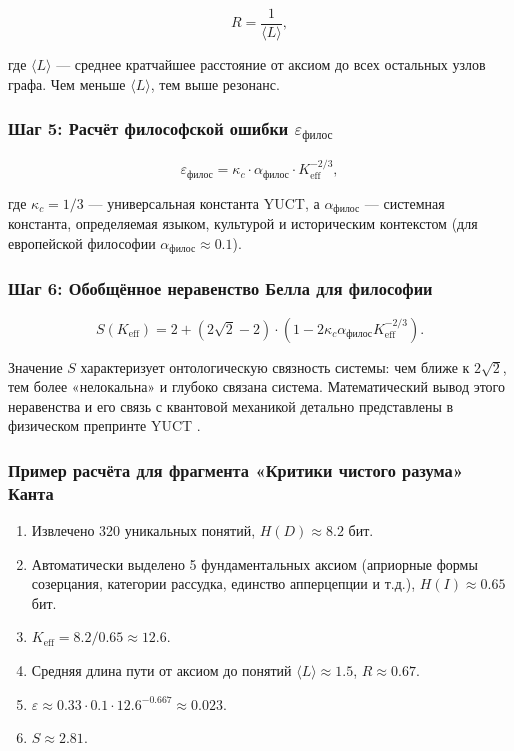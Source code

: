 \documentclass[12pt,a4paper]{article}
\newcommand{\kappac}{\kappa_c}
\newcommand{\eps}{\varepsilon}
\begin{document}
	\[
	R = \frac{1}{\langle L \rangle},
	\]
	
	где \(\langle L \rangle\) — среднее кратчайшее расстояние от аксиом до всех остальных узлов графа. Чем меньше \(\langle L \rangle\), тем выше резонанс.
	
	\subsubsection{Шаг 5: Расчёт философской ошибки \(\eps_{\text{филос}}\)}
	
	\[
	\eps_{\text{филос}} = \kappac \cdot \alpha_{\text{филос}} \cdot K_{\mathrm{eff}}^{-2/3},
	\]
	
	где \(\kappac = 1/3\) — универсальная константа YUCT, а \(\alpha_{\text{филос}}\) — системная константа, определяемая языком, культурой и историческим контекстом (для европейской философии \(\alpha_{\text{филос}} \approx 0.1\)).
	
	\subsubsection{Шаг 6: Обобщённое неравенство Белла для философии}
	
	\[
	S(K_{\mathrm{eff}}) = 2 + (2\sqrt{2} - 2) \cdot \left(1 - 2\kappac \alpha_{\text{филос}} K_{\mathrm{eff}}^{-2/3}\right).
	\]
	
	Значение \(S\) характеризует онтологическую связность системы: чем ближе к \(2\sqrt{2}\), тем более «нелокальна» и глубоко связана система. Математический вывод этого неравенства и его связь с квантовой механикой детально представлены в физическом препринте YUCT \cite{Yakushev2026b}.
	
	\subsubsection{Пример расчёта для фрагмента «Критики чистого разума» Канта}
	
	\begin{enumerate}
		\item Извлечено 320 уникальных понятий, \(H(D) \approx 8.2\) бит.
		\item Автоматически выделено 5 фундаментальных аксиом (априорные формы созерцания, категории рассудка, единство апперцепции и т.д.), \(H(I) \approx 0.65\) бит.
		\item \(K_{\mathrm{eff}} = 8.2 / 0.65 \approx 12.6\).
		\item Средняя длина пути от аксиом до понятий \(\langle L \rangle \approx 1.5\), \(R \approx 0.67\).
		\item \(\eps \approx 0.33 \cdot 0.1 \cdot 12.6^{-0.667} \approx 0.023\).
		\item \(S \approx 2.81\).
	\end{enumerate}
	
\end{document}
